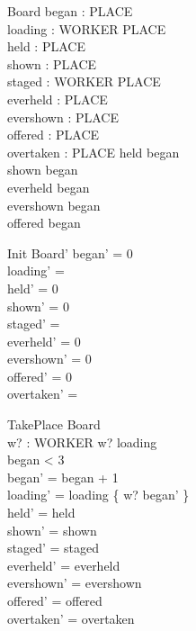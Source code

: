 \documentclass[a4paper,10pt,fleqn]{article}
\begin{document}
\begin{schema}{Board}
  began : PLACE \\
  loading : WORKER \pfun PLACE \\
  held : PLACE \\
  shown : PLACE \\
  staged : WORKER \pfun PLACE \\
  everheld : PLACE \\
  evershown : PLACE \\
  offered : PLACE \\
  overtaken : \power PLACE
\where
  held \leq began \\
  shown \leq began \\
  everheld \leq began \\
  evershown \leq began \\
  offered \leq began
\end{schema}

\begin{schema}{Init}
  Board'
\where
  began' = 0 \\
  loading' = \emptyset \\
  held' = 0 \\
  shown' = 0 \\
  staged' = \emptyset \\
  everheld' = 0 \\
  evershown' = 0 \\
  offered' = 0 \\
  overtaken' = \emptyset
\end{schema}

\begin{schema}{TakePlace}
  \Delta Board \\
  w? : WORKER
\where
  w? \notin \dom loading \\
  began < 3 \\
  began' = began + 1 \\
  loading' = loading \cup \{ w? \mapsto began' \} \\
  held' = held \\
  shown' = shown \\
  staged' = staged \\
  everheld' = everheld \\
  evershown' = evershown \\
  offered' = offered \\
  overtaken' = overtaken
\end{schema}
\end{document}
